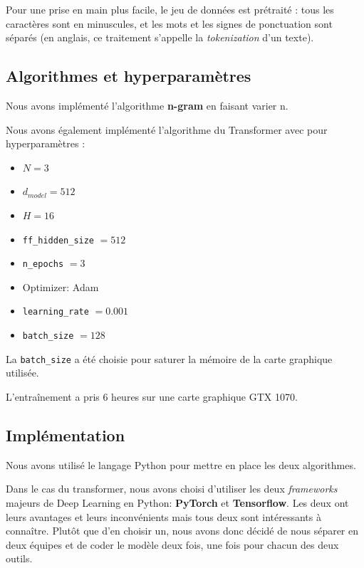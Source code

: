 Pour une prise en main plus facile, le jeu de données est prétraité :
tous les caractères sont en minuscules, et les mots et les signes de
ponctuation sont séparés (en anglais, ce traitement s'appelle la
\emph{tokenization} d'un texte).

\hypertarget{algorithmes-et-hyperparamuxe8tres}{%
\subsection{Algorithmes et
hyperparamètres}\label{algorithmes-et-hyperparamuxe8tres}}

Nous avons implémenté l'algorithme \textbf{n-gram} en faisant varier n.

Nous avons également implémenté l'algorithme du Transformer avec pour
hyperparamètres :

\begin{itemize}
\item
  \(N = 3\)
\item
  \(d_{model} = 512\)
\item
  \(H = 16\)
\item
  \texttt{ff\_hidden\_size} $ = 512$
\item
  \texttt{n\_epochs} $ = 3$
\item
  Optimizer: Adam
\item
  \texttt{learning\_rate} $ = 0.001 $
\item
  \texttt{batch\_size} $ = 128$
\end{itemize}

La \texttt{batch\_size} a été choisie pour saturer la mémoire de la
carte graphique utilisée.

L'entraînement a pris 6 heures sur une carte graphique GTX 1070.

\hypertarget{impluxe9mentation}{%
\subsection{Implémentation}\label{impluxe9mentation}}

Nous avons utilisé le langage Python pour mettre en place les deux
algorithmes.

Dans le cas du transformer, nous avons choisi d'utiliser les deux
\emph{frameworks} majeurs de Deep Learning en Python: \textbf{PyTorch}
et \textbf{Tensorflow}. Les deux ont leurs avantages et leurs inconvénients
mais tous deux sont intéressants à connaître. Plutôt que d’en choisir un,
nous avons donc décidé de nous séparer en deux équipes et de coder le
modèle deux fois, une fois pour chacun des deux outils.

